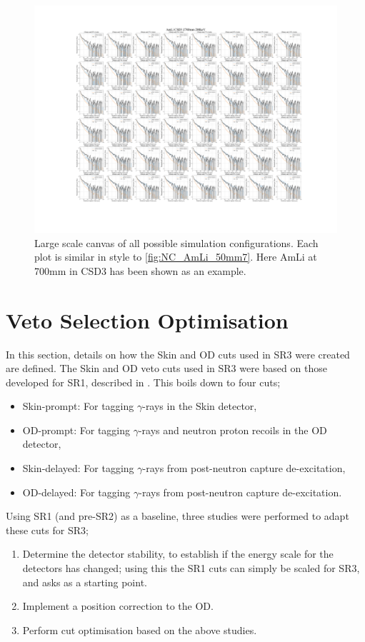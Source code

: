 \begin{figure}
    \centering
    \includegraphics[width=\linewidth]{figures/VetoEfficiency/AmLi_CSD3_Z700mm_200keV.png}
    \caption{Large scale canvas of all possible simulation configurations. Each plot is similar in style to \autoref{fig:NC_AmLi_50mm7}. Here AmLi at 700mm in CSD3 has been shown as an example.}
    \label{fig:NC_Canvas}
\end{figure}

\section{Veto Selection Optimisation}
In this section, details on how the Skin and OD cuts used in SR3 were created are defined. The Skin and OD veto cuts used in SR3 were based on those developed for SR1, described in \cite{LZCollaboration:2024lux}.
This boils down to four cuts;
\begin{itemize}
    \item Skin-prompt: For tagging $\gamma$-rays in the Skin detector,
    \item OD-prompt: For tagging $\gamma$-rays and neutron proton recoils in the OD detector,
    \item Skin-delayed: For tagging $\gamma$-rays from post-neutron capture de-excitation,
    \item OD-delayed: For tagging $\gamma$-rays from post-neutron capture de-excitation.
\end{itemize}

Using SR1 (and pre-SR2) as a baseline, three studies were performed to adapt these cuts for SR3;
\begin{enumerate}
    \item Determine the detector stability, to establish if the energy scale for the detectors has changed; using this the SR1 cuts can simply be scaled for SR3, and asks as a starting point.
    \item Implement a position correction to the OD.
    \item Perform cut optimisation based on the above studies.
\end{enumerate}

